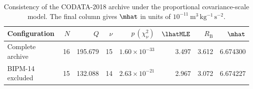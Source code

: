 \begin{table}[htbp]
\centering
\caption{Consistency of the CODATA-2018 archive under the proportional covariance-scale model. The final column gives $\mhat$ in units of $10^{-11}\ \mathrm{m^{3}\,kg^{-1}\,s^{-2}}$.}
\label{tab:historical}
\small
\begin{tabular}{lrrrrrrr}
\toprule
Configuration & $N$ & $Q$ & $\nu$ & $p\,(\chi^{2}_{\nu})$ & $\lhatMLE$ & $R_{\mathrm{B}}$ & $\mhat$ \\
\midrule
Complete archive & 16 & 195.679 & 15 & $1.60 \times 10^{-33}$ & 3.497 & 3.612 & 6.674300 \\
BIPM-14 excluded & 15 & 132.088 & 14 & $2.63 \times 10^{-21}$ & 2.967 & 3.072 & 6.674227 \\
\bottomrule
\end{tabular}
\end{table}

